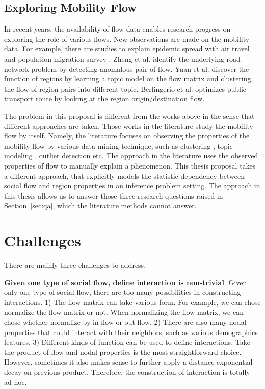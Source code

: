 \subsection{Exploring Mobility Flow}

In recent years, the availability of flow data enables research progress on exploring the role of various flows. New observations are made on the mobility data. For example, there are studies to explain epidemic spread with air travel \cite{huang2013global, tatem2014mapping} and population migration survey \cite{pindolia2013demographics}. Zheng et al. \cite{zheng2011urban} identify the underlying road network problem by detecting anomalous pair of flow. Yuan et al. \cite{yuan2012discovering} discover the function of regions by learning a topic model on the flow matrix and clustering the flow of region pairs into different topic.  Berlingerio et al. \cite{berlingerio2013allaboard} optimizes public transport route by looking at the region origin/destination flow. 



The problem in this proposal is different from the works above in the sense that different approaches are taken. Those works in the literature study the mobility flow by itself. Namely, the literature focuses on observing the properties of the mobility flow by various data mining technique, such as clustering \cite{berlingerio2013allaboard}, topic modeling \cite{yuan2012discovering}, outlier detection \cite{zheng2011urban} etc.  The approach in the literature uses the observed properties of flow to manually explain a phenomenon. This thesis proposal takes a different approach, that explicitly models the statistic dependency between social flow and region properties in an inference problem setting. The approach in this thesis allows us to answer those three research questions raised in Section~\ref{sec:qa}, which the literature methods cannot answer.



\section{Challenges}

There are mainly three challenges to address.

\textbf{Given one type of social flow, define interaction is non-trivial}. Given only one type of social flow, there are too many possibilities in constructing interactions.   1) The flow matrix can take various form. For example, we can chose normalize the flow matrix or not. When normalizing the flow matrix, we can chose whether normalize by in-flow or out-flow. 
2) There are also many nodal properties that could interact with their neighbors, such as various demographics features. 
3) Different kinds of function can be used to define interactions. Take the product of flow and nodal properties is the most straightforward choice. However, sometimes it also makes sense to further apply a distance exponential decay on previous product.
Therefore, the construction of interaction is totally ad-hoc. 



